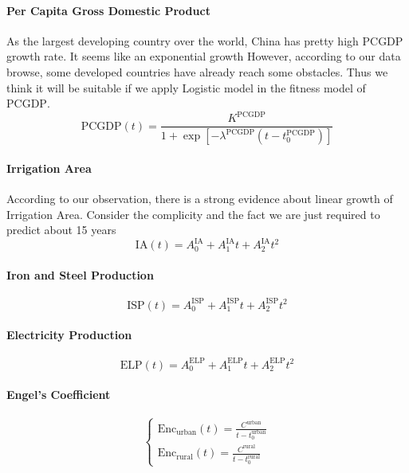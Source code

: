     \paragraph{Per Capita Gross Domestic Product}
      As the largest developing country over the world, China has pretty high PCGDP growth rate. It seems like an exponential growth However, according to our data browse, some developed countries have already reach some obstacles. Thus we think it will be suitable if we apply Logistic model in the fitness model of $\text{PCGDP}$.
      $$
      \text{PCGDP}(t) = \frac{K^\text{PCGDP}}{1+\exp[-\lambda^\text{PCGDP}(t-t_0^\text{PCGDP})]}
      $$

    \paragraph{Irrigation Area}
    According to our observation, there is a strong evidence about linear growth of Irrigation Area. Consider the complicity and the fact we are just required to predict about 15 years
    $$
    \text{IA}(t) = A_0^\text{IA}+A_1^\text{IA} t + A_2^\text{IA} t^2
    $$

    \paragraph{Iron and Steel Production}
    $$
    \text{ISP}(t) = A_0^\text{ISP}+A_1^\text{ISP} t + A_2^\text{ISP} t^2
    $$

    \paragraph{Electricity Production}
    $$
    \text{ELP}(t) = A_0^\text{ELP}+A_1^\text{ELP} t + A_2^\text{ELP} t^2
    $$

    \paragraph{Engel's Coefficient}
    $$
    \begin{cases}
    \text{Enc}_\text{urban}(t) = \frac{C^\text{urban}}{t-t_0^\text{urban}} \\
    \text{Enc}_\text{rural}(t) = \frac{C^\text{rural}}{t-t_0^\text{rural}}
    \end{cases}
    $$


